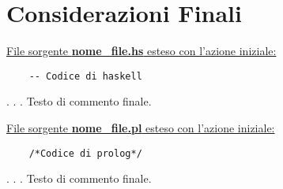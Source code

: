 \documentclass{article}
\begin{document}
\section{Considerazioni Finali}
\raggedright
\underline{File sorgente \textbf{nome\_file.hs} esteso con l'azione iniziale:}
\lstset{language=Haskell}
\begin{lstlisting}
	-- Codice di haskell
\end{lstlisting}
.
\newline
.
\newline
.
\newline
Testo di commento finale.
\newpage
\raggedright
\underline{File sorgente \textbf{nome\_file.pl} esteso con l'azione iniziale:}
\lstset{language=Prolog}
\begin{lstlisting}
	/*Codice di prolog*/
\end{lstlisting}
.
\newline
.
\newline
.
\newline
Testo di commento finale.
\end{document}
